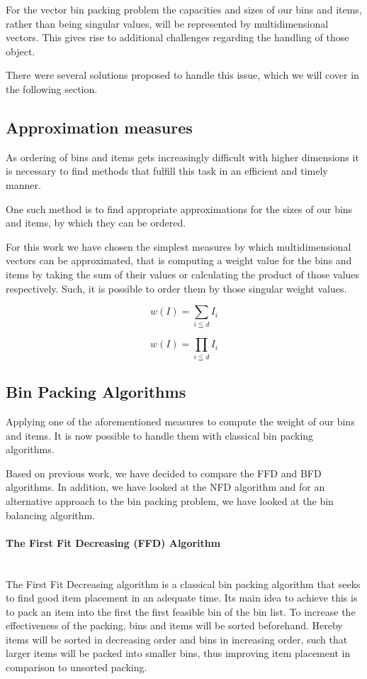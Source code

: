 \documentclass[a4paper,11pt,titlepage]{article}
\begin{document}
For the vector bin packing problem the capacities and sizes of our bins and items, rather than being singular values, will be represented by multidimensional vectors. This gives rise to additional challenges regarding the handling of those object.

There were several solutions proposed to handle this issue, which we will cover in the following section. 


\subsection{Approximation measures}
As ordering of bins and items gets increasingly difficult with higher dimensions it is necessary to find methods that fulfill this task in an efficient and timely manner.  

One such method is to find appropriate approximations for the sizes of our bins and items, by which they can be ordered.

For this work we have chosen the simplest measures by which multidimensional vectors can be approximated, that is computing a weight value for the bins and items by taking the sum of their values or calculating the product of those values respectively. 
Such, it is possible to order them by those singular weight values.



\[
w(I)=\sum_{i\leqq d} I_i 
\] 

\[
w(I)=\prod_{i\leqq d} I_i 
\] 

\subsection{Bin Packing Algorithms}

Applying one of the aforementioned measures to compute the weight of our bins and items. It is now possible to handle them with classical bin packing algorithms.

Based on previous work, we have decided to compare the FFD and BFD algorithms. In addition, we have looked at the NFD algorithm and for an alternative approach to the bin packing problem, we have looked at the bin balancing algorithm.


\paragraph{The First Fit Decreasing (FFD) Algorithm}
\mbox{} \\
The First Fit Decreasing algorithm is a classical bin packing algorithm that seeks to find good item placement in an adequate time. Its main idea to achieve this is to pack an item into the first the first feasible bin of the bin list. To increase the effectiveness of the packing, bins and items will be sorted beforehand. Hereby items will be sorted in decreasing order and bins in increasing order, such that larger items will be packed into smaller bins, thus improving item placement in comparison to unsorted packing.
\end{document}
